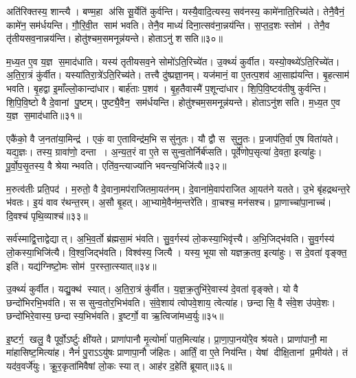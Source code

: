 अति॑रिक्तस्य॒ शान्त्यै।
बण्म॒हा अ॑सि सू॒र्येति॑ कुर्वन्ति।
यस्यै॒वादि॒त्यस्य॒ सव॑नस्य॒ कामे॑नाति॒रिच्य॑ते।
तेनै॒वैनं॒ कामे॑न॒ सम॑र्धयन्ति।
गौ॒रि॒वी॒त साम॑ भवति।
तेनै॒व माध्यं॑ दिना॒त्सव॑ना॒न्नय॑न्ति।
स॒प्त॒द॒शः स्तोम॑।
तेनै॒व तृ॑तीयसव॒नान्नय॑न्ति।
होतु॑श्चम॒समनून्न॑यन्ते।
होताऽनु॑ शसति॥३०॥

म॒ध्य॒त ए॒व य॒ज्ञ स॒माद॑धाति।
यस्य॑ तृतीयसव॒ने सोमो॑ऽति॒रिच्ये॑त।
उ॒क्थ्यं॑ कुर्वीत।
यस्यो॒क्थ्ये॑ऽति॒रिच्ये॑त।
अ॒ति॒रा॒त्रं कु॑र्वीत।
यस्या॑तिरा॒त्रे॑ऽति॒रिच्य॑ते।
तत्त्वै दु॑ष्प्रज्ञा॒नम्।
यज॑मानं॒ वा ए॒तत्प॒शव॑ आ॒साह्य॑यन्ति।
बृ॒हत्साम॑ भवति।
बृ॒हद्वा इ॒माँल्लो॒कान्दा॑धार।
बार्\mbox{}ह॑ताः प॒शव॑।
बृ॒ह॒तैवास्मै॑ प॒शून्दा॑धार।
शि॒पि॒वि॒ष्टव॑तीषु कुर्वन्ति।
शि॒पि॒वि॒ष्टो वै दे॒वानां पु॒ष्टम्।
पुष्ट्यै॒वैन॒ सम॑र्धयन्ति।
होतु॑श्चम॒समनून्न॑यन्ते।
होताऽनु॑शसति।
म॒ध्य॒त ए॒व य॒ज्ञ स॒माद॑धाति॥३१॥\anuvakamend[य॒न्ति॒ सव॑नस्याति॒रिच्य॑ते शसति दाधारा॒ष्टौ च॑]

एकै॑को॒ वै ज॒नता॑या॒मिन्द्र॑।
एकं॒ वा ए॒ताविन्द्र॑म॒भि ससु॑नुतः।
यौ द्वौ स सुनु॒तः।
प्र॒जाप॑ति॒र्वा ए॒ष विता॑यते।
यद्य॒ज्ञः।
तस्य॒ ग्रावा॑णो॒ दन्ता।
अ॒न्य॒त॒रं वा ए॒ते ससुन्व॒तोर्निर्ब॑प्सति।
पूर्वे॑णोप॒सृत्या॑ दे॒वता॒ इत्या॑हुः।
पू॒र्वो॒प॒सृ॒तस्य॒ वै श्रेयान्भवति।
एति॑व॒न्त्याज्या॑नि भवन्त्य॒भिजि॑त्यै॥३२॥

म॒रुत्व॑तीः प्रति॒पद॑।
म॒रुतो॒ वै दे॒वाना॒मप॑राजितमा॒यत॑नम्।
दे॒वाना॑मे॒वाप॑राजित आ॒यत॑ने यतते।
उ॒भे बृ॑हद्रथन्त॒रे भ॑वतः।
इ॒यं वाव र॑थन्त॒रम्।
अ॒सौ बृ॒हत्।
आ॒भ्यामे॒वैन॑म॒न्तरे॑ति।
वा॒चश्च॒ मन॑सश्च।
प्रा॒णाच्चा॑पा॒नाच्च॑।
दि॒वश्च॑ पृथि॒व्याश्च॑॥३३॥

सर्व॑स्माद्वि॒त्ताद्वेद्यात्।
अ॒भि॒व॒र्तो ब्र॑ह्मसा॒मं भ॑वति।
सु॒व॒र्गस्य॑ लो॒कस्या॒भिवृ॑त्त्यै।
अ॒भि॒जिद्भ॑वति।
सु॒व॒र्गस्य॑ लो॒कस्या॒भिजि॑त्यै।
वि॒श्व॒जिद्भ॑वति।
विश्व॑स्य॒ जित्यै।
यस्य॒ भूयासो यज्ञक्र॒तव॒ इत्या॑हुः।
स दे॒वता॑ वृङ्क्त॒ इति॑।
यद्य॑ग्निष्टो॒मः सोम॑ प॒रस्ता॒त्स्यात्॥३४॥

उ॒क्थ्यं॑ कुर्वीत।
यद्यु॒क्थ॑ स्यात्।
अ॒ति॒रा॒त्रं कु॑र्वीत।
य॒ज्ञ॒क्र॒तुभि॑रे॒वास्य॑ दे॒वता॑ वृङ्क्ते।
यो वै छन्दो॑भिरभि॒भव॑ति।
स ससुन्व॒तोर॒भिभ॑वति।
सं॒वे॒शाय॑ त्वोपवे॒शाय॒ त्वेत्या॑ह।
छन्दासि॒ वै सं॑वे॒श उ॑पवे॒शः।
छन्दो॑भिरे॒वास्य॒ छन्दास्य॒भिभ॑वति।
इ॒ष्टर्गो॒ वा ऋ॒त्विजा॑मध्व॒र्युः॥३५॥

इ॒ष्टर्ग॒ खलु॒ वै पूर्वो॒ऽर्ष्टुः क्षी॑यते।
प्राणा॑पानौ मृ॒त्योर्मा॑ पात॒मित्या॑ह।
प्रा॒णा॒पा॒नयो॑रे॒व श्र॑यते।
प्राणा॑पानौ॒ मा मा॑हासिष्ट॒मित्या॑ह।
नैनं॑ पु॒राऽऽयु॑षः प्राणापा॒नौ ज॑हितः।
आर्तिं॒ वा ए॒ते निय॑न्ति।
येषां दीक्षि॒तानां प्र॒मीय॑ते।
तं यद॑व॒वर्जे॑युः।
क्रू॒र॒कृता॑मिवैषां लो॒कः स्यात्।
आह॑र द॒हेति॑ ब्रूयात्॥३६॥

